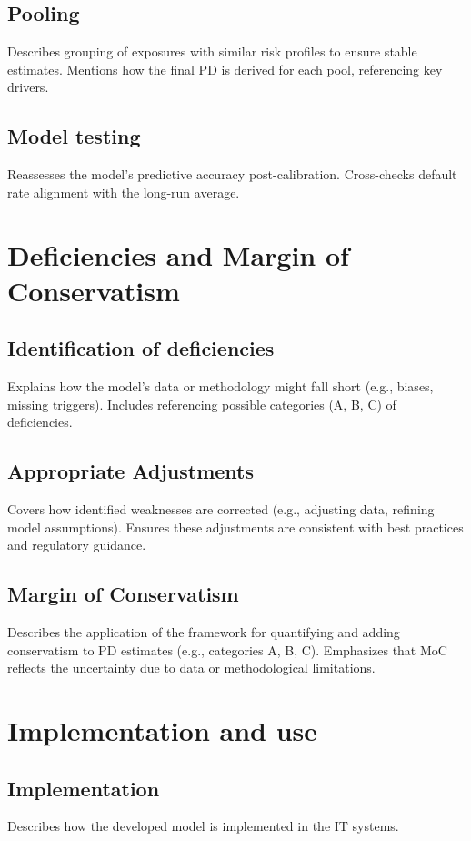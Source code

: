 \documentclass[12pt,a4paper]{article}
\begin{document}
\subsection{Pooling}
Describes grouping of exposures with similar risk profiles to ensure stable estimates. Mentions how the final PD is derived for each pool, referencing key drivers.

\subsection{Model testing}
Reassesses the model’s predictive accuracy post-calibration. Cross-checks default rate alignment with the long-run average.

\section{Deficiencies and Margin of Conservatism}

\subsection{Identification of deficiencies}
Explains how the model’s data or methodology might fall short (e.g., biases, missing triggers). Includes referencing possible categories (A, B, C) of deficiencies.

\subsection{Appropriate Adjustments}
Covers how identified weaknesses are corrected (e.g., adjusting data, refining model assumptions). Ensures these adjustments are consistent with best practices and regulatory guidance.

\subsection{Margin of Conservatism}
Describes the application of the framework for quantifying and adding conservatism to PD estimates (e.g., categories A, B, C). Emphasizes that MoC reflects the uncertainty due to data or methodological limitations.

\section{Implementation and use}

\subsection{Implementation}
Describes how the developed model is implemented in the IT systems.
\end{document}
